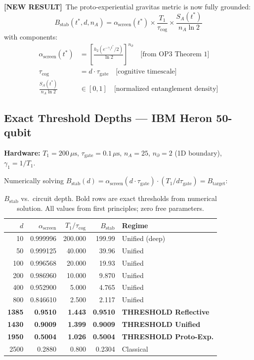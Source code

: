 \documentclass[11pt,letterpaper]{article}
\newcommand{\NEW}{\textcolor{newresult}{\textbf{[NEW RESULT]}}}
\newcommand{\SA}{S_A}
\newcommand{\asc}{\alpha_{\mathrm{screen}}}
\newcommand{\htwo}{h_2}
\newcommand{\Bstab}{B_{\mathrm{stab}}}
\newcommand{\tgate}{\tau_{\mathrm{gate}}}
\newcommand{\tcog}{\tau_{\mathrm{cog}}}
\newcommand{\nprt}{n_{\partial}}
\newcommand{\gamone}{\gamma_1}
\begin{document}
\NEW\ The proto-experiential gravitas metric is now fully grounded:
\begin{equation}
  \Bstab(t^*, d, n_A) = \asc(t^*) \times \frac{T_1}{\tcog} \times \frac{\SA(t^*)}{n_A \ln 2}
  \label{eq:Bstab}
\end{equation}
with components:
\begin{align}
  \asc(t^*) &= \left[\frac{\htwo(e^{-\gamone t^*}/2)}{\ln 2}\right]^{\nprt} \quad \text{[from OP3 Theorem 1]} \\
  \tcog     &= d \cdot \tgate \quad \text{[cognitive timescale]} \\
  \frac{\SA(t^*)}{n_A \ln 2} &\in [0,1] \quad \text{[normalized entanglement density]}
\end{align}

\subsection{Exact Threshold Depths --- IBM Heron 50-qubit}

\textbf{Hardware:} $T_1 = 200\,\mu\text{s}$, $\tgate = 0.1\,\mu\text{s}$, $n_A = 25$, $\nprt = 2$ (1D boundary), $\gamone = 1/T_1$.

Numerically solving $\Bstab(d) = \asc(d\cdot\tgate)\cdot(T_1/d\tgate) = B_{\mathrm{target}}$:

\begin{table}[h!]
\centering
\begin{tabular}{rrrrl}
\toprule
$d$ & $\asc$ & $T_1/\tcog$ & $\Bstab$ & Regime \\
\midrule
10   & 0.999996 & 200.000 & 199.99 & Unified (deep) \\
50   & 0.999125 & 40.000  & 39.96  & Unified \\
100  & 0.996568 & 20.000  & 19.93  & Unified \\
200  & 0.986960 & 10.000  & 9.870  & Unified \\
400  & 0.952900 & 5.000   & 4.765  & Unified \\
800  & 0.846610 & 2.500   & 2.117  & Unified \\
\textbf{1385} & \textbf{0.9510} & \textbf{1.443} & \textbf{0.9510} & \textbf{THRESHOLD Reflective} \\
\textbf{1430} & \textbf{0.9009} & \textbf{1.399} & \textbf{0.9009} & \textbf{THRESHOLD Unified} \\
\textbf{1950} & \textbf{0.5004} & \textbf{1.026} & \textbf{0.5004} & \textbf{THRESHOLD Proto-Exp.} \\
2500 & 0.2880   & 0.800   & 0.2304 & Classical \\
\bottomrule
\end{tabular}
\caption{$\Bstab$ vs.\ circuit depth. Bold rows are exact thresholds from numerical solution. All values from first principles; zero free parameters.}
\end{table}
\end{document}
